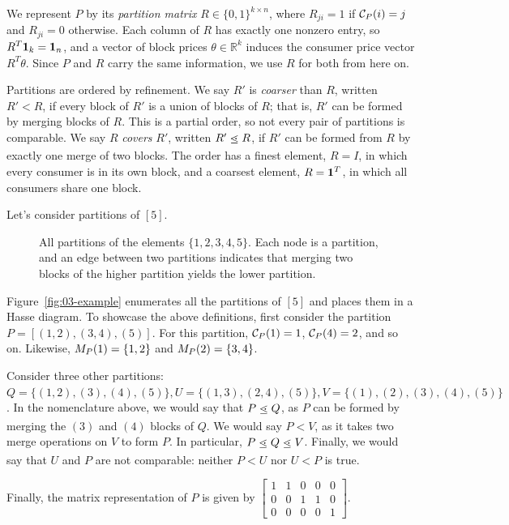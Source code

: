     We represent $P$ by its \emph{partition matrix} $R \in \{0,1\}^{k \times n}$, where $R_{ji} = 1$ if $\mathcal{C}_{P}(i) = j$ and $R_{ji} = 0$ otherwise. Each column of $R$ has exactly one nonzero entry, so $R^T \mathbf{1}_k = \mathbf{1}_n$, and a vector of block prices $\theta \in \mathbb{R}^k$ induces the consumer price vector $R^T \theta$. Since $P$ and $R$ carry the same information, we use $R$ for both from here on.

    Partitions are ordered by refinement. We say $R'$ is \emph{coarser} than $R$, written $R' < R$, if every block of $R'$ is a union of blocks of $R$; that is, $R'$ can be formed by merging blocks of $R$. This is a partial order, so not every pair of partitions is comparable. We say $R$ \emph{covers} $R'$, written $R' \leatom R$, if $R'$ can be formed from $R$ by exactly one merge of two blocks. The order has a finest element, $R = I$, in which every consumer is in its own block, and a coarsest element, $R = \mathbf{1}^T$, in which all consumers share one block.

    \begin{example}
        Let's consider partitions of $[5]$.
        \begin{figure}
            \centering 
            \resizebox{\textwidth}{!}{
                

            }
            \caption{All partitions of the elements $\{1,2,3,4,5\}$. Each node is a partition, and an edge between two partitions indicates that merging two blocks of the higher partition yields the lower partition. }
        \end{figure}\label{fig:03-example}

        Figure~\ref{fig:03-example} enumerates all the partitions of $[5]$ and places them in a Hasse diagram. To showcase the above definitions, first consider the partition $P = [(1,2), (3,4), (5)]$. For this partition, $\mathcal{C}_{P}(1)=1$, $\mathcal{C}_{P}(4)=2$, and so on. Likewise, $M_{P}(1)= \{ 1,2\}$ and $M_{P}(2)=\{3,4\}$.

        Consider three other partitions: $Q = \{(1,2), (3),(4), (5)\}, U=\{(1,3),(2,4),(5)\}, V=\{(1),(2), (3), (4), (5)\}$. In the nomenclature above, we would say that $P \leatom Q$, as $P$ can be formed by merging the $(3)$ and $(4)$ blocks of $Q$. We would say $P < V$, as it takes two merge operations on $V$ to form $P$. In particular, $P \leatom Q \leatom V$. Finally, we would say that $U$ and $P$ are not comparable: neither $P < U$ nor $U < P$ is true.

        Finally, the matrix representation of $P$ is given by $\begin{bmatrix}
            1 & 1 & 0 & 0 & 0 \\
            0 & 0 & 1 & 1 & 0 \\
            0 & 0 & 0 & 0 & 1
        \end{bmatrix}$.

    \end{example}



